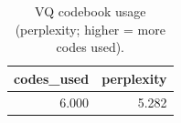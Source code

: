 \begin{table}[t]
\centering
\caption{VQ codebook usage (perplexity; higher = more codes used).}
\label{tab:codebook}
\begin{tabular}{rr}
\toprule
codes\_used & perplexity \\
\midrule
6.000 & 5.282 \\
\bottomrule
\end{tabular}
\end{table}
